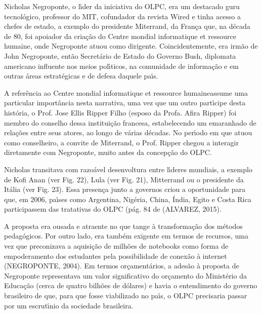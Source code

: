 \documentclass[
12pt,		%
openright,	%
twoside,  %
a4paper,			%
chapter=TITLE,		%
english,			%
french,				%
spanish,			%
brazil				%
]{USPSC-classe/USPSC}
\begin{document}
Nicholas Negroponte, o l\'{\i}der da iniciativa do OLPC, era um destacado \textquotedbl guru \textquotedbl  tecnol\'ogico, professor do MIT, cofundador da revista Wired e tinha acesso a chefes de estado, a exemplo do presidente Miterrand, da Fran\c{c}a que, na d\'ecada de 80, foi apoiador da cria\c{c}\~ao do \textquotedbl Centre mondial informatique et ressource humaine\textquotedbl , onde Negroponte atuou como dirigente. Coincidentemente, era irm\~ao de John Negroponte, ent\~ao Secret\'ario de Estado do Governo Bush, diplomata americano influente nos meios pol\'{\i}ticos, na comunidade de informa\c{c}\~ao e em outras \'areas estrat\'egicas e de defesa daquele pa\'{\i}s.









A refer\^encia ao \textquotedbl Centre mondial informatique et ressource humaine\textquotedbl  assume uma particular import\^ancia nesta narrativa, uma vez que um outro part\'{\i}cipe desta hist\'oria, o Prof. Jose Ellis Ripper Filho (esposo da Profa. Afira Ripper) foi membro do conselho dessa institui\c{c}\~ao francesa, estabelecendo um emaranhado de rela\c{c}\~oes entre seus atores, ao longo de v\'arias d\'ecadas. No per\'{\i}odo em que atuou como conselheiro, a convite de Miterrand, o Prof. Ripper chegou a interagir diretamente com Negroponte, muito antes da concep\c{c}\~ao do OLPC.









Nicholas transitava com razo\'avel desenvoltura entre l\'{\i}deres mundiais, a exemplo de Kofi Anan (ver Fig. 22), Lula (ver Fig. 21), Mitterrand ou o presidente da It\'alia (ver Fig. 23). Essa presen\c{c}a junto a governos criou a oportunidade para que, em 2006, pa\'{\i}ses como Argentina, Nig\'eria, China, \'India, Egito e Costa Rica participassem das tratativas do OLPC  (p\'ag. 84 de (ALVAREZ, 2015).









A proposta era ousada e atraente no que tange \`a transforma\c{c}\~ao dos m\'etodos pedag\'ogicos. Por outro lado, era tamb\'em exigente em termos de recursos, uma vez que preconizava a aquisi\c{c}\~ao de milh\~oes de notebooks como forma de empoderamento dos estudantes pela possibilidade de conex\~ao \`a internet  (NEGROPONTE, 2004). Em termos or\c{c}ament\'arios, a ades\~ao \`a proposta de Negroponte representava um valor significativo do or\c{c}amento do Minist\'erio da Educa\c{c}\~ao (cerca de quatro bilh\~oes de d\'olares) e havia o entendimento do governo brasileiro de que, para que fosse viabilizado no pa\'{\i}s, o OLPC precisaria passar por um escrut\'{\i}nio da sociedade brasileira.
\end{document}
